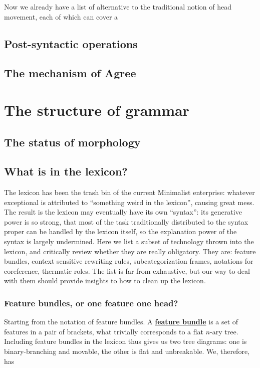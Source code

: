 \documentclass[a4paper]{article}
\newcommand*{\concept}[1]{\underline{\textbf{#1}}}
\begin{document}
Now we already have a list of alternative to the traditional notion of head movement, each of which can cover a 

\subsection{Post-syntactic operations}\label{sec:post-syn-op}

\subsection{The mechanism of Agree}


\section{The structure of grammar}

\subsection{The status of morphology}

\subsection{What is in the lexicon?}


The lexicon has been the trash bin of the current Minimalist enterprise: whatever exceptional is attributed to ``something weird in the lexicon'', causing great mess.
The result is the lexicon may eventually have its own ``syntax'': its generative power is so strong, that most of the task traditionally distributed to the syntax proper can be handled by the lexicon itself, so the explanation power of the syntax is largely undermined.
Here we list a subset of technology thrown into the lexicon, and critically review whether they are really obligatory.
They are: feature bundles, context sensitive rewriting rules, subcategorization frames, notations for coreference, thermatic roles.
The list is far from exhaustive, but our way to deal with them should provide insights to how to clean up the lexicon.

\subsubsection{Feature bundles, or one feature one head?}

Starting from the notation of feature bundles. A \concept{feature bundle} is a set of features in a pair of brackets, what trivially corresponds to a flat $n$-ary tree.
Including feature bundles in the lexicon thus gives us two tree diagrams: one is binary-branching and movable, the other is flat and unbreakable.
We, therefore, has 
\end{document}
